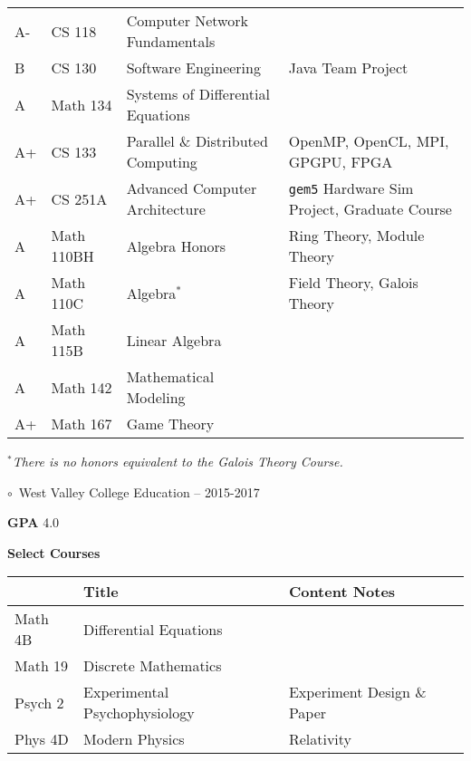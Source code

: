 \documentclass[11pt]{article}
\newcommand{\myTitle}[1]{{ \vspace{2mm} \LARGE \color{titleColor} \hspace{-12mm} \( \circ \)\ \textsf{#1} \vspace{2mm}}}
\newcommand{\myKey}[1]{{\color{keyColor}\textbf{#1}}}
\begin{document}
{\begin{tabular}{l l l l}
\rowcolor{oddColor}
A- & CS 118 & Computer Network Fundamentals & \\
\rowcolor{oddColor}
B  & CS 130 & Software Engineering & Java Team Project \\
\rowcolor{oddColor}
A  & Math 134 & Systems of Differential Equations & \\

\rowcolor{evenColor}
A+ & CS 133 & Parallel \& Distributed Computing & OpenMP, OpenCL, MPI, GPGPU, FPGA \\
\rowcolor{evenColor}
A+ & CS 251A & Advanced Computer Architecture & \texttt{gem5} Hardware Sim Project, Graduate Course \\
\rowcolor{evenColor}
A  & Math 110BH & Algebra Honors & Ring Theory, Module Theory \\

\rowcolor{oddColor}
A  & Math 110C & Algebra\( ^* \) & Field Theory, Galois Theory \\
\rowcolor{oddColor}
A  & Math 115B & Linear Algebra & \\

\rowcolor{evenColor}
A & Math 142 & Mathematical Modeling & \\
\rowcolor{evenColor}
A+ & Math 167 & Game Theory & \\
\hline
\end{tabular}
}

\textit{\( ^* \)There is no honors equivalent to the Galois Theory Course.}

\myTitle{West Valley College Education -- 2015-2017}

\myKey{GPA} 4.0

\myKey{Select Courses}

\begin{tabular}{l l l}
\hline
 & Title & Content Notes \\
\hline
\rowcolor{oddColor} Math 4B & Differential Equations & \\
\rowcolor{oddColor} Math 19 & Discrete Mathematics & \\
\rowcolor{oddColor}
Psych 2 & Experimental Psychophysiology & Experiment Design \& Paper \\
\rowcolor{oddColor} Phys 4D & Modern Physics & Relativity \\
\hline
\end{tabular}

\vspace{10mm}
\end{document}
